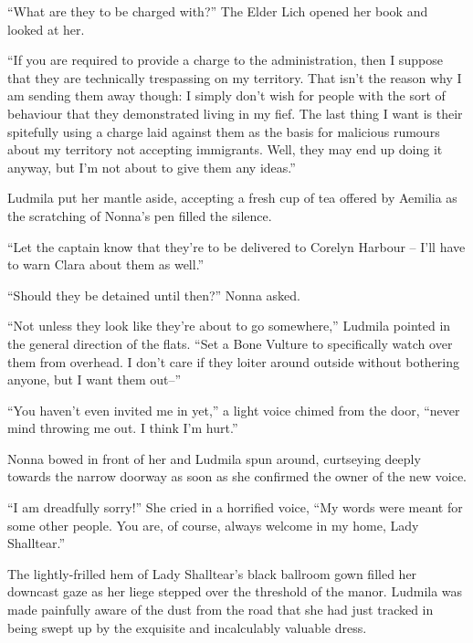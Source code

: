  

“What are they to be charged with?” The Elder Lich opened her book and looked at her.

 

“If you are required to provide a charge to the administration, then I suppose that they are technically trespassing on my territory. That isn’t the reason why I am sending them away though: I simply don’t wish for people with the sort of behaviour that they demonstrated living in my fief. The last thing I want is their spitefully using a charge laid against them as the basis for malicious rumours about my territory not accepting immigrants. Well, they may end up doing it anyway, but I’m not about to give them any ideas.”

 

Ludmila put her mantle aside, accepting a fresh cup of tea offered by Aemilia as the scratching of Nonna’s pen filled the silence.

 

“Let the captain know that they’re to be delivered to Corelyn Harbour – I’ll have to warn Clara about them as well.”

 

“Should they be detained until then?” Nonna asked.

 

“Not unless they look like they’re about to go somewhere,” Ludmila pointed in the general direction of the flats. “Set a Bone Vulture to specifically watch over them from overhead. I don’t care if they loiter around outside without bothering anyone, but I want them out–”

 

“You haven’t even invited me in yet,” a light voice chimed from the door, “never mind throwing me out. I think I’m hurt.”

 

Nonna bowed in front of her and Ludmila spun around, curtseying deeply towards the narrow doorway as soon as she confirmed the owner of the new voice.

 

“I am dreadfully sorry!” She cried in a horrified voice, “My words were meant for some other people. You are, of course, always welcome in my home, Lady Shalltear.”

 

The lightly-frilled hem of Lady Shalltear’s black ballroom gown filled her downcast gaze as her liege stepped over the threshold of the manor. Ludmila was made painfully aware of the dust from the road that she had just tracked in being swept up by the exquisite and incalculably valuable dress.

